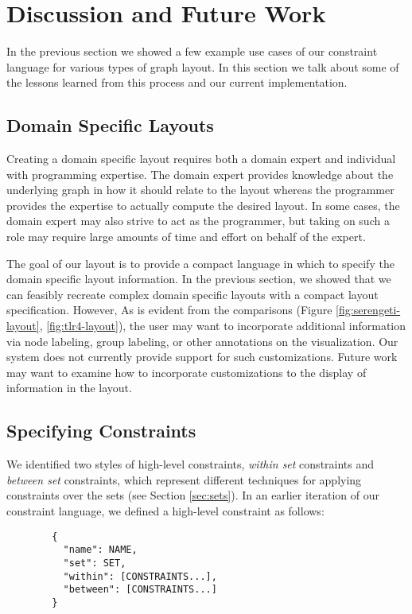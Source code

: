 \section{Discussion and Future Work}
In the previous section we showed a few example use cases of our constraint language for various types of graph layout. In this section we talk about some of the lessons learned from this process and our current implementation.

\subsection{Domain Specific Layouts}
Creating a domain specific layout requires both a domain expert and individual with programming expertise. The domain expert provides knowledge about the underlying graph in how it should relate to the layout whereas the programmer provides the expertise to actually compute the desired layout. In some cases, the domain expert may also strive to act as the programmer, but taking on such a role may require large amounts of time and effort on behalf of the expert.

The goal of our layout is to provide a compact language in which to specify the domain specific layout information. In the previous section, we showed that we can feasibly recreate complex domain specific layouts with a compact layout specification. However, As is evident from the comparisons (Figure \ref{fig:serengeti-layout}, \ref{fig:tlr4-layout}), the user may want to incorporate additional information via node labeling, group labeling, or other annotations on the visualization. Our system does not currently provide support for such customizations. Future work may want to examine how to incorporate customizations to the display of information in the layout.

\subsection{Specifying Constraints}
We identified two styles of high-level constraints, \emph{within set} constraints and \emph{between set} constraints, which represent different techniques for applying constraints over the sets (see Section \ref{sec:sets}). In an earlier iteration of our constraint language, we defined a high-level constraint as follows:

\begin{verbatim}
        {
          "name": NAME,
          "set": SET,
          "within": [CONSTRAINTS...],
          "between": [CONSTRAINTS...]
        }
\end{verbatim}

